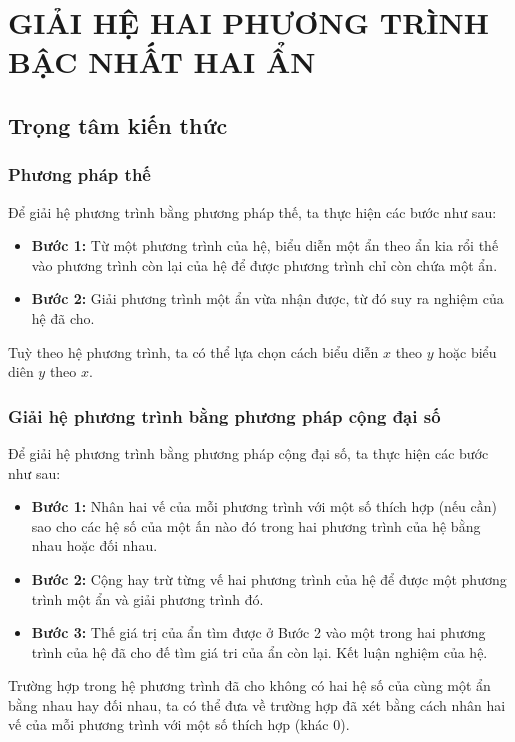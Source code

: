 \setcounter{section}{2}
\section{GIẢI HỆ HAI PHƯƠNG TRÌNH BẬC NHẤT HAI ẨN}
\subsection{Trọng tâm kiến thức}
\begin{tomtat}
	\subsubsection{Phương pháp thế}
\begin{boxdn}
	Để giải hệ phương trình bằng phương pháp thế, ta thực hiện các bước như sau:
	\begin{itemize}
	\item \textbf{Bước 1:} Từ một phương trình của hệ, biểu diễn một ẩn theo ẩn kia rổi thế vào phương trình còn lại của hệ để được phương trình chỉ còn chứa một ẩn.
	\item \textbf{Bước 2:} Giải phương trình một ẩn vừa nhận được, từ đó suy ra nghiệm của hệ đã cho.
	\end{itemize}
\end{boxdn}
\begin{note}
	Tuỳ theo hệ phương trình, ta có thể lựa chọn cách biểu diễn $x$ theo $y$ hoặc biểu diên $y$ theo $x$. 
\end{note}
\subsubsection{Giải hệ phương trình bằng phương pháp cộng đại số}
\begin{boxdn}
	Để giải hệ phương trình bằng phương pháp cộng đại số, ta thực hiện các bước như sau:
	\begin{itemize}
	\item \textbf{Bước 1:} Nhân hai vế của mỗi phương trình với một số thích hợp (nếu cần) sao cho các hệ số của một ấn nào đó trong hai phương trình của hệ bằng nhau hoặc đối nhau.
	\item \textbf{Bước 2:} Cộng hay trừ từng vế hai phương trình của hệ để được một phương trình một ẩn và giải phương trình đó.
	\item \textbf{Bước 3:} Thế giá trị của ẩn tìm được ở Bước 2 vào một trong hai phương trình của hệ đã cho đế tìm giá tri của ẩn còn lại. Kết luận nghiệm của hệ.
	\end{itemize}
\end{boxdn}
\begin{note}	
	Trường hợp trong hệ phương trình đã cho không có hai hệ số của cùng một ẩn bằng nhau hay đối nhau, ta có thể đưa về trường hợp đã xét bằng cách nhân hai vế của mỗi phương trình với một số thích hợp (khác $0$).
\end{note}

\end{tomtat}
